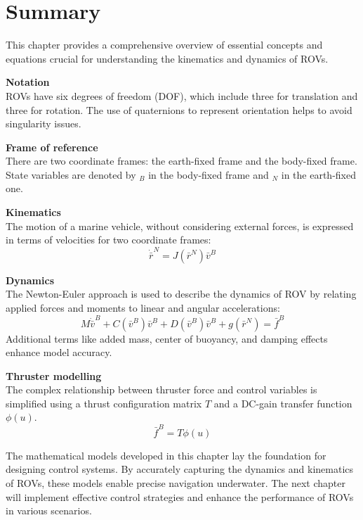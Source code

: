 \section{Summary}

This chapter provides a comprehensive overview of essential 
concepts and equations crucial for understanding the kinematics and dynamics of ROVs.

\textbf{Notation} \\
ROVs have six degrees of freedom (DOF), which include three for translation and three for rotation.
The use of quaternions to represent orientation helps to avoid singularity issues.

\textbf{Frame of reference} \\
There are two coordinate frames: the earth-fixed frame and the body-fixed frame. 
State variables are denoted by $_B$ in the body-fixed frame and $_N$ in the earth-fixed one.

\textbf{Kinematics} \\
The motion of a marine vehicle, without considering external forces, 
is expressed in terms of velocities for two coordinate frames:
$$
\dot{\bar{r}}^N=J(\bar{r}^N) \bar{v}^B
$$

\textbf{Dynamics} \\
The Newton-Euler approach is used to describe the dynamics of ROV by relating applied 
forces and moments to linear and angular accelerations:
$$
M \dot{\bar{v}}^B + C(\bar{v}^B) \bar{v}^B+D(\bar{v}^B) \bar{v}^B+g(\bar{r}^N)= \bar{f}^B
$$
Additional terms like added mass, center of buoyancy, and damping effects enhance model accuracy.

\textbf{Thruster modelling} \\
The complex relationship between thruster force and control variables 
is simplified using a thrust configuration matrix $T$ and a DC-gain transfer function $\phi(u)$.
$$
\bar{f}^B=T\phi(u)
$$

The mathematical models developed in this chapter lay the foundation for designing control systems. 
By accurately capturing the dynamics and kinematics of ROVs, these models enable precise navigation 
underwater. The next chapter will implement effective control strategies and enhance the 
performance of ROVs in various scenarios.